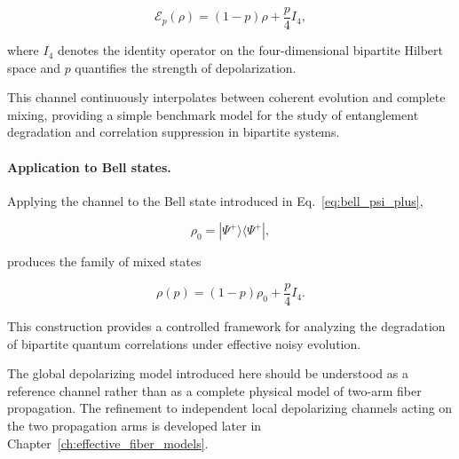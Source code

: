 \begin{equation}
\mathcal{E}_p(\rho)
=
(1-p)\rho
+
\frac{p}{4}I_4,
\label{eq:global_two_qubit_depolarizing_channel}
\end{equation}

where \( I_4 \) denotes the identity operator on the four-dimensional bipartite Hilbert space and \( p \) quantifies the strength of depolarization.

\medskip

This channel continuously interpolates between coherent evolution and complete mixing, providing a simple benchmark model for the study of entanglement degradation and correlation suppression in bipartite systems.

\medskip

\paragraph{Application to Bell states.}

Applying the channel to the Bell state introduced in Eq.~\eqref{eq:bell_psi_plus},

\[
\rho_0
=
|\Psi^+\rangle\langle\Psi^+|,
\]

produces the family of mixed states

\begin{equation}
\rho(p)
=
(1-p)\rho_0
+
\frac{p}{4}I_4.
\label{eq:depolarized_bell_state}
\end{equation}

This construction provides a controlled framework for analyzing the degradation of bipartite quantum correlations under effective noisy evolution.

\bigskip

The global depolarizing model introduced here should be understood as a reference channel rather than as a complete physical model of two-arm fiber propagation. The refinement to independent local depolarizing channels acting on the two propagation arms is developed later in Chapter~\ref{ch:effective_fiber_models}.


